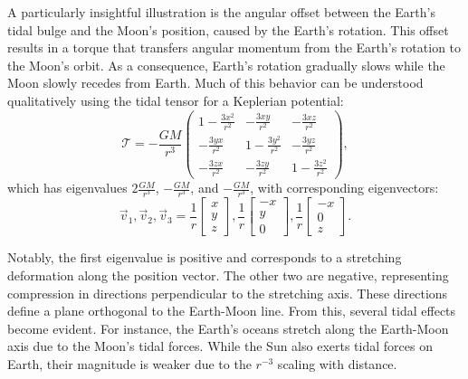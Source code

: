             A particularly insightful illustration is the angular offset between the Earth's tidal bulge and the Moon's position, caused by the Earth's rotation. This offset results in a torque that transfers angular momentum from the Earth's rotation to the Moon's orbit. As a consequence, Earth's rotation gradually slows while the Moon slowly recedes from Earth. Much of this behavior can be understood qualitatively using the tidal tensor for a Keplerian potential:
            \begin{equation}
                \mathcal{T}= -\frac{GM}{r^3}\left(\begin{matrix}
                    1-\frac{3x^2}{r^2} & -\frac{3xy}{r^2} & -\frac{3xz}{r^2} \\
                    -\frac{3yx}{r^2} & 1-\frac{3y^2}{r^2} & -\frac{3yz}{r^2} \\
                    -\frac{3zx}{r^2} & -\frac{3zy}{r^2} & 1-\frac{3z^2}{r^2}
                \end{matrix}\right),
            \end{equation}
            which has eigenvalues $2\frac{GM}{r^3}$, $-\frac{GM}{r^3}$, and $-\frac{GM}{r^3}$, with corresponding eigenvectors:
            \begin{equation}
                \vec{v}_1,\vec{v}_2,\vec{v}_3 = \dfrac{1}{r}\begin{bmatrix} x \\ y \\ z \end{bmatrix}, \dfrac{1}{r}\begin{bmatrix} -x \\ y \\ 0 \end{bmatrix}, \dfrac{1}{r}\begin{bmatrix} -x \\ 0 \\ z \end{bmatrix}.
            \end{equation}

            Notably, the first eigenvalue is positive and corresponds to a stretching deformation along the position vector. The other two are negative, representing compression in directions perpendicular to the stretching axis. These directions define a plane orthogonal to the Earth-Moon line. From this, several tidal effects become evident. For instance, the Earth's oceans stretch along the Earth-Moon axis due to the Moon's tidal forces. While the Sun also exerts tidal forces on Earth, their magnitude is weaker due to the $r^{-3}$ scaling with distance.

